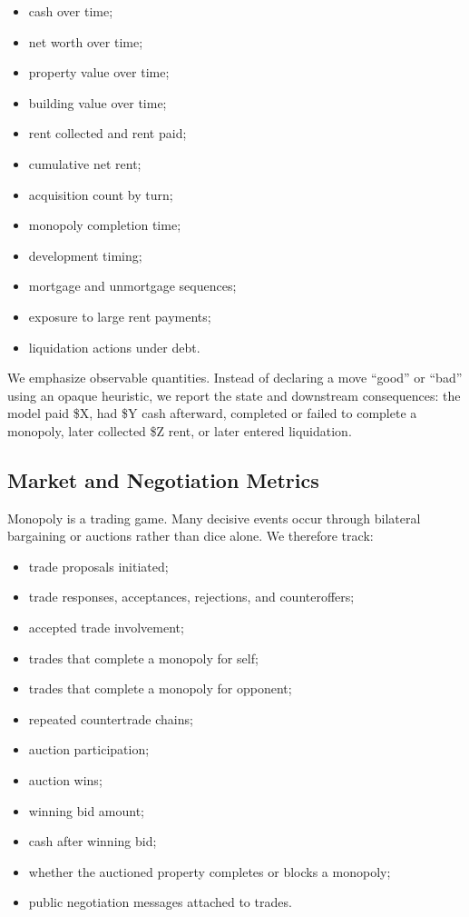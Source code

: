 \documentclass[conference]{IEEEtran}
\begin{document}
\begin{itemize}
    \item cash over time;
    \item net worth over time;
    \item property value over time;
    \item building value over time;
    \item rent collected and rent paid;
    \item cumulative net rent;
    \item acquisition count by turn;
    \item monopoly completion time;
    \item development timing;
    \item mortgage and unmortgage sequences;
    \item exposure to large rent payments;
    \item liquidation actions under debt.
\end{itemize}

We emphasize observable quantities. Instead of declaring a move ``good'' or ``bad'' using an opaque heuristic, we report the state and downstream consequences: the model paid \$X, had \$Y cash afterward, completed or failed to complete a monopoly, later collected \$Z rent, or later entered liquidation.

\subsection{Market and Negotiation Metrics}

Monopoly is a trading game. Many decisive events occur through bilateral bargaining or auctions rather than dice alone. We therefore track:

\begin{itemize}
    \item trade proposals initiated;
    \item trade responses, acceptances, rejections, and counteroffers;
    \item accepted trade involvement;
    \item trades that complete a monopoly for self;
    \item trades that complete a monopoly for opponent;
    \item repeated countertrade chains;
    \item auction participation;
    \item auction wins;
    \item winning bid amount;
    \item cash after winning bid;
    \item whether the auctioned property completes or blocks a monopoly;
    \item public negotiation messages attached to trades.
\end{itemize}
\end{document}
